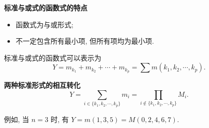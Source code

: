 \textbf{标准与或式的函数式的特点}
\begin{itemize}
    \item 函数式为与或形式;
    \item 不一定包含所有最小项, 但所有项均为最小项.
\end{itemize}

标准与或式的函数式可以表示为
\begin{equation}
    Y=m_{k_1}+m_{k_2}+\cdots+m_{k_p}=\sum m(k_1,k_2,\cdots,k_p).
\end{equation}

\textbf{两种标准形式的相互转化}
\begin{equation}
    Y=\sum_{i\in\{k_1,k_2,\cdots,k_p\}}m_i=\prod_{i\notin\{k_1,k_2,\cdots,k_p\}}M_i.
\end{equation}

例如, 当 $n=3$ 时, 有 $Y=m(1,3,5)=M(0,2,4,6,7)$.
